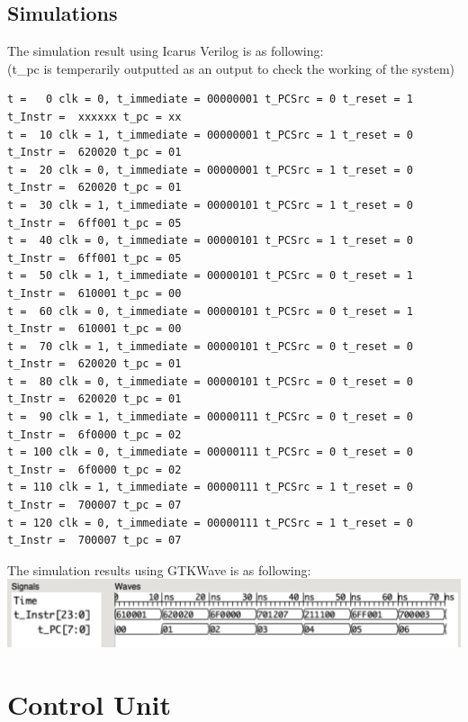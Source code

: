 \documentclass{article}
\begin{document}
\subsection{Simulations}
The simulation result using Icarus Verilog is as following: \\
(t\_pc is temperarily outputted as an output to check the working of the system)
\begin{Verbatim}
t =   0 clk = 0, t_immediate = 00000001 t_PCSrc = 0 t_reset = 1 t_Instr =  xxxxxx t_pc = xx
t =  10 clk = 1, t_immediate = 00000001 t_PCSrc = 1 t_reset = 0 t_Instr =  620020 t_pc = 01
t =  20 clk = 0, t_immediate = 00000001 t_PCSrc = 1 t_reset = 0 t_Instr =  620020 t_pc = 01
t =  30 clk = 1, t_immediate = 00000101 t_PCSrc = 1 t_reset = 0 t_Instr =  6ff001 t_pc = 05
t =  40 clk = 0, t_immediate = 00000101 t_PCSrc = 1 t_reset = 0 t_Instr =  6ff001 t_pc = 05
t =  50 clk = 1, t_immediate = 00000101 t_PCSrc = 0 t_reset = 1 t_Instr =  610001 t_pc = 00
t =  60 clk = 0, t_immediate = 00000101 t_PCSrc = 0 t_reset = 1 t_Instr =  610001 t_pc = 00
t =  70 clk = 1, t_immediate = 00000101 t_PCSrc = 0 t_reset = 0 t_Instr =  620020 t_pc = 01
t =  80 clk = 0, t_immediate = 00000101 t_PCSrc = 0 t_reset = 0 t_Instr =  620020 t_pc = 01
t =  90 clk = 1, t_immediate = 00000111 t_PCSrc = 0 t_reset = 0 t_Instr =  6f0000 t_pc = 02
t = 100 clk = 0, t_immediate = 00000111 t_PCSrc = 0 t_reset = 0 t_Instr =  6f0000 t_pc = 02
t = 110 clk = 1, t_immediate = 00000111 t_PCSrc = 1 t_reset = 0 t_Instr =  700007 t_pc = 07
t = 120 clk = 0, t_immediate = 00000111 t_PCSrc = 1 t_reset = 0 t_Instr =  700007 t_pc = 07
\end{Verbatim}
The simulation results using GTKWave is as following:\vspace{5pt}\\
\includegraphics[width=\textwidth]{instruction_memory.png}


\newpage
\section{Control Unit}
\end{document}
